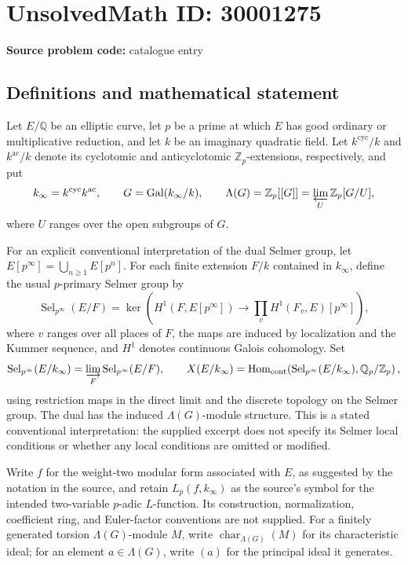 \documentclass[11pt]{article}
\newcommand{\Z}{\mathbb{Z}}
\newcommand{\Q}{\mathbb{Q}}
\begin{document}
\section*{UnsolvedMath ID: 30001275}
\textbf{Source problem code:} catalogue entry
\subsection{Definitions and mathematical statement}
Let \(E/\Q\) be an elliptic curve, let \(p\) be a prime at which \(E\) has good ordinary or multiplicative reduction, and let \(k\) be an imaginary quadratic field. Let \(k^{\mathrm{cyc}}/k\) and \(k^{\mathrm{ac}}/k\) denote its cyclotomic and anticyclotomic \(\Z_p\)-extensions, respectively, and put
\[
k_\infty=k^{\mathrm{cyc}}k^{\mathrm{ac}},\qquad G=\operatorname{Gal}(k_\infty/k),\qquad \Lambda(G)=\Z_p[[G]]=\varprojlim_U\Z_p[G/U],
\]
where \(U\) ranges over the open subgroups of \(G\).

For an explicit conventional interpretation of the dual Selmer group, let \(E[p^\infty]=\bigcup_{n\geq1}E[p^n]\). For each finite extension \(F/k\) contained in \(k_\infty\), define the usual \(p\)-primary Selmer group by
\[
\operatorname{Sel}_{p^\infty}(E/F)=\ker\!\left(H^1(F,E[p^\infty])\longrightarrow\prod_v H^1(F_v,E)[p^\infty]\right),
\]
where \(v\) ranges over all places of \(F\), the maps are induced by localization and the Kummer sequence, and \(H^1\) denotes continuous Galois cohomology. Set
\[
\operatorname{Sel}_{p^\infty}(E/k_\infty)=\varinjlim_F\operatorname{Sel}_{p^\infty}(E/F),\qquad
X(E/k_\infty)=\operatorname{Hom}_{\mathrm{cont}}\!\left(\operatorname{Sel}_{p^\infty}(E/k_\infty),\Q_p/\Z_p\right),
\]
using restriction maps in the direct limit and the discrete topology on the Selmer group. The dual has the induced \(\Lambda(G)\)-module structure. This is a stated conventional interpretation: the supplied excerpt does not specify its Selmer local conditions or whether any local conditions are omitted or modified.

Write \(f\) for the weight-two modular form associated with \(E\), as suggested by the notation in the source, and retain \(L_p(f,k_\infty)\) as the source's symbol for the intended two-variable \(p\)-adic \(L\)-function. Its construction, normalization, coefficient ring, and Euler-factor conventions are not supplied. For a finitely generated torsion \(\Lambda(G)\)-module \(M\), write \(\operatorname{char}_{\Lambda(G)}(M)\) for its characteristic ideal; for an element \(a\in\Lambda(G)\), write \((a)\) for the principal ideal it generates.
\end{document}
